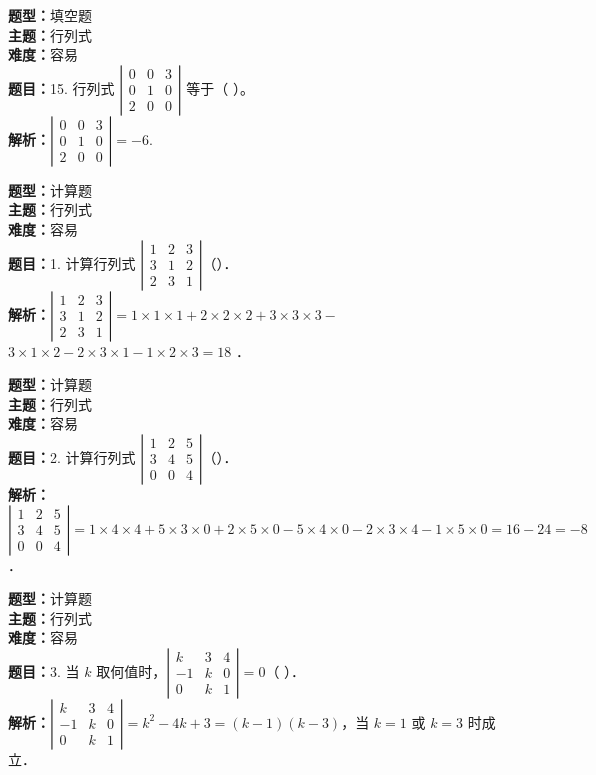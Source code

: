 \documentclass{ctexart}
\newenvironment{question}[5]{%
	\noindent\textbf{题型：}#1\\
	\textbf{主题：}#2\\
	\textbf{难度：}#3\\
	\textbf{题目：}#4\\
	\textbf{解析：}#5\\
	\vspace{1em}
}{}
\begin{document}
\begin{question}
	{填空题}
	{行列式}
	{容易}
	{15. 行列式 $\left|\begin{array}{lll}0 & 0 & 3 \\ 0 & 1 & 0 \\ 2 & 0 & 0\end{array}\right|$ 等于（ ）。}
	{$\left|\begin{array}{lll}0 & 0 & 3 \\ 0 & 1 & 0 \\ 2 & 0 & 0\end{array}\right|=-6$.}
\end{question}


\newpage

\begin{question} 
	{计算题} 
	{行列式}
	{容易}
	{1. 计算行列式 $\left|\begin{array}{lll}1 & 2 & 3 \\ 3 & 1 & 2 \\ 2 & 3 & 1\end{array}\right|$（）．}
	{$\left|\begin{array}{lll}1 & 2 & 3 \\ 3 & 1 & 2 \\ 2 & 3 & 1\end{array}\right|=1 \times 1 \times 1+2 \times 2 \times 2+3 \times 3 \times 3-$ $3 \times 1 \times 2-2 \times 3 \times 1-1 \times 2 \times 3=18$ ．}
\end{question}

\begin{question} 
	{计算题} 
	{行列式}
	{容易}
	{2. 计算行列式 $\left|\begin{array}{lll}1 & 2 & 5 \\ 3 & 4 & 5 \\ 0 & 0 & 4\end{array}\right|$（）．}
	{$\left|\begin{array}{lll}1 & 2 & 5 \\ 3 & 4 & 5 \\ 0 & 0 & 4\end{array}\right|=1 \times 4 \times 4+5 \times 3 \times 0+2 \times 5 \times 0-5 \times 4 \times 0-2 \times 3 \times 4-1 \times 5 \times 0=16-24=-8$．}
\end{question}

\begin{question} 
	{计算题} 
	{行列式}
	{容易}
	{3. 当 $k$ 取何值时，$\left|\begin{array}{ccc}k & 3 & 4 \\ -1 & k & 0 \\ 0 & k & 1\end{array}\right|=0$（ ）．}
	{$\left|\begin{array}{ccc}k & 3 & 4 \\ -1 & k & 0 \\ 0 & k & 1\end{array}\right|=k^2-4k+3=(k-1)(k-3)$，当 $k=1$ 或 $k=3$ 时成立．}
\end{question}
\end{document}
